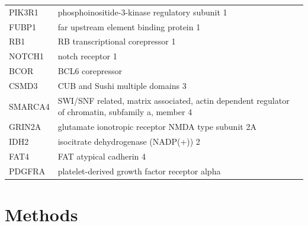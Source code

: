 \documentclass[12pt]{article}
\newtheorem{Proof of Lemma}{Proof of Lemma}
\begin{document}
\begin{table}[h!]
\begin{tabular}{|p{3.5cm}|p{11cm}|p{2cm}|}
  PIK3R1                    & phosphoinositide-3-kinase regulatory subunit 1                                                    & \\
  FUBP1                     & far upstream element binding protein 1                                                            & \\
  RB1                       & RB transcriptional corepressor 1                                                                  & \\
  NOTCH1                    & notch receptor 1                                                                                  & \\
  BCOR                      & BCL6 corepressor                                                                                  & \\
  CSMD3                     & CUB and Sushi multiple domains 3                                                                  & \\
  SMARCA4                   & SWI/SNF related, matrix associated, actin dependent regulator of chromatin, subfamily a, member 4 & \\
  GRIN2A                    & glutamate ionotropic receptor NMDA type subunit 2A                                                & \\
  IDH2                      & isocitrate dehydrogenase (NADP(+)) 2                                                              & \\
  FAT4                      & FAT atypical cadherin 4                                                                           & \\
  PDGFRA                    & platelet-derived growth factor receptor alpha                                                     & \\ \hline
  \end{tabular}
  \label{tab:vars}
\end{table}
\newpage

\section{Methods}
\end{document}
